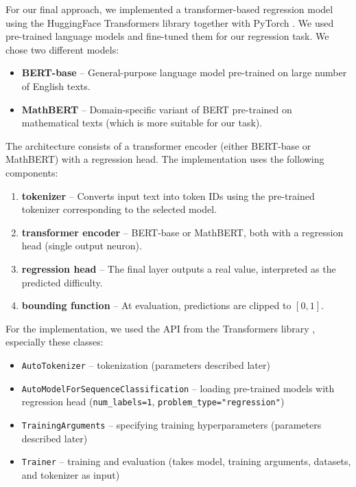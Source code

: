 \documentclass[runningheads]{llncs}
\begin{document}
For our final approach, we implemented a transformer-based regression model using the HuggingFace Transformers library \cite{transformers} together with PyTorch \cite{pytorch}. We used pre-trained language models and fine-tuned them for our regression task. We chose two different models:

\begin{itemize}
    \item \textbf{BERT-base} \cite{bertbase} -- General-purpose language model pre-trained on large number of English texts.
    \item \textbf{MathBERT} \cite{mathbert} -- Domain-specific variant of BERT pre-trained on mathematical texts (which is more suitable for our task).
\end{itemize}

The architecture consists of a transformer encoder (either BERT-base or MathBERT) with a regression head. The implementation uses the following components:

\begin{enumerate}
    \item \textbf{tokenizer} -- Converts input text into token IDs using the pre-trained tokenizer corresponding to the selected model.
    \item \textbf{transformer encoder} -- BERT-base or MathBERT, both with a regression head (single output neuron).
    \item \textbf{regression head} -- The final layer outputs a real value, interpreted as the predicted difficulty.
    \item \textbf{bounding function} -- At evaluation, predictions are clipped to $[0,1]$.
\end{enumerate}

For the implementation, we used the API from the Transformers library \cite{transformers}, especially these classes:

\begin{itemize}
    \item \texttt{AutoTokenizer} -- tokenization (parameters described later)
    \item \texttt{AutoModelForSequenceClassification} -- loading pre-trained models with regression head (\texttt{num\_labels=1}, \texttt{problem\_type="regression"})
    \item \texttt{TrainingArguments} -- specifying training hyperparameters (parameters described later)
    \item \texttt{Trainer} -- training and evaluation (takes model, training arguments, datasets, and tokenizer as input)
\end{itemize}
\end{document}
